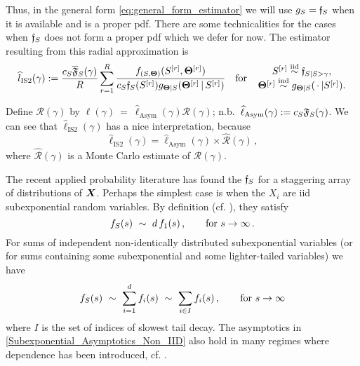 Thus, in the general form \eqref{eq:general_form_estimator} we will use $g_S = \mathfrak{f}_S$ when it is available and is a proper pdf. There are some technicalities for the cases when $\mathfrak{f}_S$ does not form a proper pdf which we defer for now.
The estimator resulting from this radial approximation is
\begin{equation} \label{eq:asymptotic_estimator}
\hat{l}_{\mathrm{IS2}}(\gamma) := \frac{c_S \AsymFTail(\gamma)}{R} \sum_{r=1}^R \frac{ f_{(S,\bfTheta)}(S^{[r]}, \bfTheta^{[r]}) }{ c_S \Asymf( S^{[r]} )g_{\bfTheta \mid S}(\bfTheta^{[r]}\,|\, S^{[r]})}
\quad \text{for} \quad
\genfrac{}{}{0pt}{}{S^{[r]} \iidDist \AsymfTrun, }{ \bfTheta^{[r]} \indDist g_{\bfTheta \mid S}( \,\cdot\, | S^{[r]}). }
\end{equation}

\begin{remark}
Define $\mathcal{R}(\gamma)$ by
$ \ell(\gamma)~=~\hat{\ell}_{\mathrm{Asym}}(\gamma) \mathcal{R}(\gamma) $; n.b.\ $\widehat{\ell}_{\mathrm{Asym}}(\gamma) := c_S \mathfrak{F}_S(\gamma)$.
We can see that $\hat{\ell}_{\mathrm{IS2}}(\gamma)$ has a nice interpretation, because
\[ \hat{\ell}_{\mathrm{IS2}}(\gamma) = \hat{\ell}_{\mathrm{Asym}}(\gamma) \times \hat{\mathcal{R}}(\gamma) \,, \]
where $\hat{\mathcal{R}}(\gamma)$ is a Monte Carlo estimate of $\mathcal{R}(\gamma)$. \remQED
\end{remark}

The recent applied probability literature has found the $\mathfrak{f}_S$ for a staggering array of distributions of $\bm{X}$. Perhaps the simplest case is when the $X_i$ are iid subexponential random variables. By definition (cf. \cite{foss2011introduction}), they satisfy
\begin{equation} \label{Subexponential_Asymptotics_IID}
f_S(s)\ \sim\ d \, f_1(s) \,,\qquad \text{for } s \to \infty\,.
\end{equation}
For sums of independent non-identically distributed subexponential variables (or for sums containing some subexponential and some lighter-tailed variables) we have
\begin{equation} \label{Subexponential_Asymptotics_Non_IID}
f_S(s)\ \sim\ \sum_{i=1}^d f_i(s)\ \sim\ \sum_{i\in I} f_i(s) \,,\qquad \text{for } s \to \infty
\end{equation}
where $I$ is the set of indices of slowest tail decay. The asymptotics in \eqref{Subexponential_Asymptotics_Non_IID} also hold in many regimes where dependence has been introduced, cf. \cite{foss2010sums,wuthrich2003asymptotic,alink2004diversification,alink2007diversification}.

